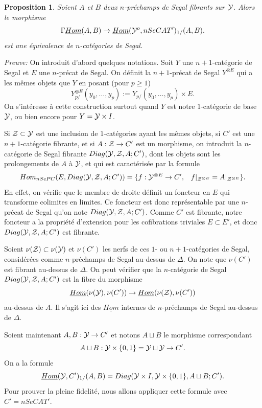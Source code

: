 \documentclass[12pt]{article}
\newtheorem{proposition}[lemma]{Proposition}
\newcommand{\Yy}{{\cal Y}}
\newcommand{\Zz}{{\cal Z}}
\begin{document}
\begin{proposition}
\label{pleinfidele}
Soient $A$ et $B$ deux $n$-pr\'echamps de Segal fibrants sur $\Yy$. Alors le
morphisme
$$
\Gamma \underline{Hom}(A,B) \rightarrow
\underline{Hom}(\Yy ^o, nSeCAT')_{1/}(A,B).
$$
est une \'equivalence de $n$-cat\'egories de Segal.
\end{proposition}
{\em Preuve:} On introduit d'abord quelques notations.
Soit $Y$ une $n+1$-cat\'egorie de Segal  et $E$ une $n$-pr\'ecat de Segal. On
d\'efinit la $n+1$-pr\'ecat de Segal $Y^{\otimes E}$  qui a les m\^emes objets
que $Y$ en posant (pour $p\geq 1$)
$$
Y^{\otimes E}_{p/}(y_0,\ldots , y_p):=
Y_{p/}(y_0,\ldots , y_p) \times E.
$$
On s'int\'eresse \`a cette construction surtout quand $Y$ est
notre $1$-cat\'egorie de base $\Yy$, ou bien encore pour $Y=\Yy \times I$.


Si $\Zz \subset \Yy$ est une inclusion de $1$-cat\'egories ayant les m\^emes
objets, si $C'$ est une $n+1$-cat\'egorie fibrante, et si $A : \Zz \rightarrow
C'$ est un
morphisme, on introduit la $n$-cat\'egorie de Segal fibrante $Diag (\Yy , \Zz ,
A; C')$, dont les objets sont les prolongements de $A$ \`a $\Yy$, et qui
est caract\'eris\'ee par la formule
$$
Hom _{nSePC}(E,Diag (\Yy , \Zz , A;C'))=\{ f: \Yy ^{\otimes E} \rightarrow C',
\;\;\; f|_{\Zz ^{\otimes E}} = A|_{\Zz ^{\otimes E}} \} .
$$
En effet, on v\'erifie que le membre de droite d\'efinit un foncteur
en $E$ qui
transforme colimites en limites. Ce foncteur est donc
repr\'esentable par une $n$-pr\'ecat de Segal qu'on note
$Diag (\Yy , \Zz ,
A;C')$.
Comme $C'$ est
fibrante, notre foncteur a la propri\'et\'e d'extension pour les
cofibrations triviales $E\subset E'$, et donc $Diag (\Yy , \Zz , A;C')$ est
fibrante.

Soient $\nu (\Zz )\subset \nu (\Yy )$ et $\nu (C')$ les nerfs de ces $1$- ou
$n+1$-cat\'egories de Segal, consid\'er\'ees comme $n$-pr\'echamps de Segal
au-dessus de $\Delta$. On note que $\nu (C' )$ est fibrant au-dessus de
$\Delta$. On peut v\'erifier
que la $n$-cat\'egorie de Segal $Diag (\Yy , \Zz , A;C')$  est la fibre du
morphisme
$$
\underline{Hom}(\nu (\Yy ), \nu (C' ))
\rightarrow
\underline{Hom}(\nu (\Zz ), \nu (C' ))
$$
au-dessus de $A$. Il s'agit ici des $\underline{Hom}$ internes de
$n$-pr\'echamps de
Segal au-dessus de $\Delta$.

Soient maintenant $A,B: \Yy \rightarrow C'$ et notons $A\sqcup B$ le morphisme
correspondant
$$
A\sqcup B:\Yy \times \{ 0,1\} = \Yy \sqcup \Yy \rightarrow C'.
$$
On a la formule
$$
\underline{Hom}(\Yy , C')_{1/}(A,B) = Diag (\Yy \times I, \Yy \times \{ 0,1\} ,
A\sqcup B ; C').
$$
Pour prouver la pleine fidelit\'e, nous allons appliquer cette formule
avec
$C'=nSeCAT'$.
\end{document}
